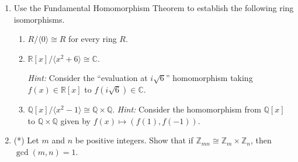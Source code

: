 \documentclass[11pt]{article}
\def\C{\mathbb{C}}
\def\Z{\mathbb{Z}}
\def\Q{\mathbb{Q}}
\def\R{\mathbb{R}}
\theoremstyle{plain}
\theoremstyle{remark}
\begin{document}
\begin{enumerate}
\item Use the Fundamental Homomorphism Theorem to establish the following ring isomorphisms.
\begin{enumerate}
\item $R/\langle 0\rangle \cong R$ for every ring $R$.
\item $\R[x]/\langle x^2+6\rangle \cong \C$.

{\scriptsize \emph{Hint:} Consider the ``evaluation at $i\sqrt{6}$'' homomorphism taking $f(x) \in \R[x]$ to $f(i\sqrt{6}) \in \C$.}
\item $\Q[x]/\langle x^2-1\rangle \cong \Q \times \Q$.
{\scriptsize \emph{Hint:} Consider the homomorphism from $\Q[x]$ to $\Q\times\Q$ given by $f(x)\mapsto (f(1), f(-1))$.}
\end{enumerate}

\item(*) Let $m$ and $n$ be positive integers. Show that if $\Z_{mn}\cong \Z_m \times \Z_n$, then $\gcd(m,n)=1$. 

\end{enumerate}
\end{document}
